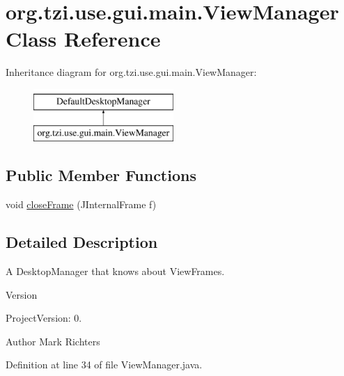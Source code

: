 \hypertarget{classorg_1_1tzi_1_1use_1_1gui_1_1main_1_1_view_manager}{\section{org.\-tzi.\-use.\-gui.\-main.\-View\-Manager Class Reference}
\label{classorg_1_1tzi_1_1use_1_1gui_1_1main_1_1_view_manager}
}
Inheritance diagram for org.\-tzi.\-use.\-gui.\-main.\-View\-Manager\-:\begin{figure}[H]
\begin{center}
\leavevmode
\includegraphics[height=2.000000cm]{classorg_1_1tzi_1_1use_1_1gui_1_1main_1_1_view_manager}
\end{center}
\end{figure}
\subsection*{Public Member Functions}
\begin{DoxyCompactItemize}
\item 
void \hyperlink{classorg_1_1tzi_1_1use_1_1gui_1_1main_1_1_view_manager_aba7e527d09d558bf8dbbf8d3051e71c7}{close\-Frame} (J\-Internal\-Frame f)
\end{DoxyCompactItemize}


\subsection{Detailed Description}
A Desktop\-Manager that knows about View\-Frames.

\begin{DoxyVersion}{Version}

\end{DoxyVersion}
\begin{DoxyParagraph}{Project\-Version\-:}
0. 
\end{DoxyParagraph}
\begin{DoxyAuthor}{Author}
Mark Richters 
\end{DoxyAuthor}


Definition at line 34 of file View\-Manager.\-java.



